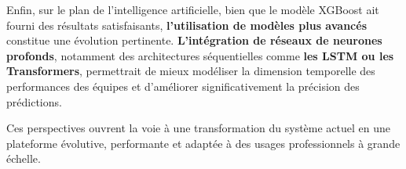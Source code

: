 Enfin, sur le plan de l’intelligence artificielle, bien que le modèle XGBoost ait fourni des résultats satisfaisants, \textbf{l’utilisation de modèles plus avancés} constitue une évolution pertinente. \textbf{L’intégration de réseaux de neurones profonds}, notamment des architectures séquentielles comme \textbf{les LSTM ou les Transformers}, permettrait de mieux modéliser la dimension temporelle des performances des équipes et d’améliorer significativement la précision des prédictions.

Ces perspectives ouvrent la voie à une transformation du système actuel en une plateforme évolutive, performante et adaptée à des usages professionnels à grande échelle.
